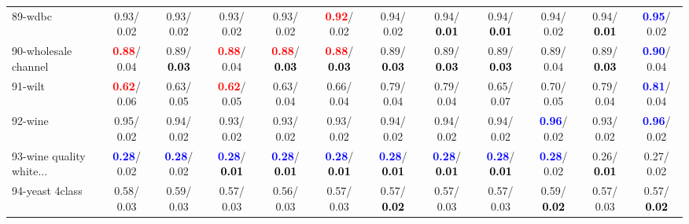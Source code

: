 \begin{table}[h]
\begin{center}
{\begin{tabular}{lc|c|c|c|c|c|c|c|c|c|c}
89-wdbc &   0.93/  0.02 &   0.93/  0.02 &   0.93/  0.02 &   0.93/  0.02 & \textcolor{red}{\textbf{  0.92}}/  0.02 &   0.94/  0.02 &   0.94/\textcolor{black}{\textbf{  0.01}} &   0.94/\textcolor{black}{\textbf{  0.01}} &   0.94/  0.02 &   0.94/\textcolor{black}{\textbf{  0.01}} & \textcolor{blue}{\textbf{  0.95}}/  0.02 \\
90-wholesale channel & \textcolor{red}{\textbf{  0.88}}/  0.04 &   0.89/\textcolor{black}{\textbf{  0.03}} & \textcolor{red}{\textbf{  0.88}}/  0.04 & \textcolor{red}{\textbf{  0.88}}/\textcolor{black}{\textbf{  0.03}} & \textcolor{red}{\textbf{  0.88}}/\textcolor{black}{\textbf{  0.03}} &   0.89/\textcolor{black}{\textbf{  0.03}} &   0.89/\textcolor{black}{\textbf{  0.03}} &   0.89/\textcolor{black}{\textbf{  0.03}} &   0.89/  0.04 &   0.89/\textcolor{black}{\textbf{  0.03}} & \textcolor{blue}{\textbf{  0.90}}/  0.04 \\
91-wilt & \textcolor{red}{\textbf{  0.62}}/  0.06 &   0.63/  0.05 & \textcolor{red}{\textbf{  0.62}}/  0.05 &   0.63/  0.04 &   0.66/  0.04 &   0.79/  0.04 &   0.79/  0.04 &   0.65/  0.07 &   0.70/  0.05 &   0.79/  0.04 & \textcolor{blue}{\textbf{  0.81}}/  0.04 \\
92-wine &   0.95/  0.02 &   0.94/  0.02 &   0.93/  0.02 &   0.93/  0.02 &   0.93/  0.02 &   0.94/  0.02 &   0.94/  0.02 &   0.94/  0.02 & \textcolor{blue}{\textbf{  0.96}}/  0.02 &   0.93/  0.02 & \textcolor{blue}{\textbf{  0.96}}/  0.02 \\ \hline
93-wine quality white... & \textcolor{blue}{\textbf{  0.28}}/  0.02 & \textcolor{blue}{\textbf{  0.28}}/  0.02 & \textcolor{blue}{\textbf{  0.28}}/\textcolor{black}{\textbf{  0.01}} & \textcolor{blue}{\textbf{  0.28}}/\textcolor{black}{\textbf{  0.01}} & \textcolor{blue}{\textbf{  0.28}}/\textcolor{black}{\textbf{  0.01}} & \textcolor{blue}{\textbf{  0.28}}/\textcolor{black}{\textbf{  0.01}} & \textcolor{blue}{\textbf{  0.28}}/\textcolor{black}{\textbf{  0.01}} & \textcolor{blue}{\textbf{  0.28}}/\textcolor{black}{\textbf{  0.01}} & \textcolor{blue}{\textbf{  0.28}}/  0.02 &   0.26/\textcolor{black}{\textbf{  0.01}} &   0.27/  0.02 \\
94-yeast 4class &   0.58/  0.03 &   0.59/  0.03 &   0.57/  0.03 &   0.56/  0.03 &   0.57/  0.03 &   0.57/\textcolor{black}{\textbf{  0.02}} &   0.57/  0.03 &   0.57/  0.03 &   0.59/\textcolor{black}{\textbf{  0.02}} &   0.57/  0.03 &   0.57/\textcolor{black}{\textbf{  0.02}} \\\end{tabular}
}\label{strats2aRFw}
\end{center}
\end{table}
